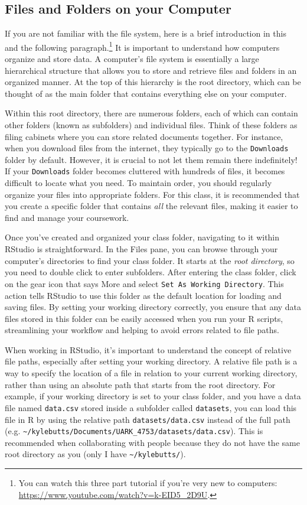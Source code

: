 \documentclass[12pt]{article}
\begin{document}
\subsection*{Files and Folders on your Computer}

If you are not familiar with the file system, here is a brief introduction in this and the following paragraph.\footnote{You can watch this three part tutorial if you're very new to computers: \url{https://www.youtube.com/watch?v=k-EID5_2D9U}.} It is important to understand how computers organize and store data. A computer's file system is essentially a large hierarchical structure that allows you to store and retrieve files and folders in an organized manner. At the top of this hierarchy is the root directory, which can be thought of as the main folder that contains everything else on your computer.

Within this root directory, there are numerous folders, each of which can contain other folders (known as subfolders) and individual files. Think of these folders as filing cabinets where you can store related documents together. For instance, when you download files from the internet, they typically go to the \texttt{Downloads} folder by default. However, it is crucial to not let them remain there indefinitely! If your \texttt{Downloads} folder becomes cluttered with hundreds of files, it becomes difficult to locate what you need. To maintain order, you should regularly organize your files into appropriate folders. For this class, it is recommended that you create a specific folder that contains \emph{all} the relevant files, making it easier to find and manage your coursework.

Once you've created and organized your class folder, navigating to it within RStudio is straightforward. In the Files pane, you can browse through your computer's directories to find your class folder. It starts at the \emph{root directory}, so you need to double click to enter subfolders. After entering the class folder, click on the gear icon that says More and select \texttt{Set As Working Directory}. This action tells RStudio to use this folder as the default location for loading and saving files. By setting your working directory correctly, you ensure that any data files stored in this folder can be easily accessed when you run your R scripts, streamlining your workflow and helping to avoid errors related to file paths.

When working in RStudio, it's important to understand the concept of relative file paths, especially after setting your working directory. A relative file path is a way to specify the location of a file in relation to your current working directory, rather than using an absolute path that starts from the root directory. For example, if your working directory is set to your class folder, and you have a data file named \texttt{data.csv} stored inside a subfolder called \texttt{datasets}, you can load this file in R by using the relative path \texttt{datasets/data.csv} instead of the full path (e.g. \texttt{\textasciitilde/kylebutts/Documents/UARK\_4753/datasets/data.csv}). This is recommended when collaborating with people because they do not have the same root directory as you (only I have \texttt{\textasciitilde/kylebutts/}). 
\end{document}
